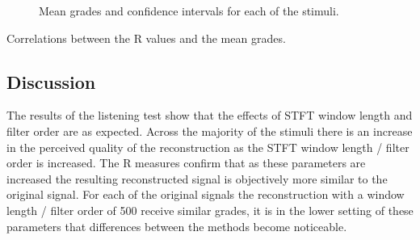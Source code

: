 \begin{figure}[h!]
			\quad
			\caption{Mean grades and confidence intervals for each of the stimuli.}
			\label{fig:SMCResults}
		\end{figure}

		\begin{table}[h!]
			\centering
			
			\caption{Correlations between the R values and the mean grades.}
			\label{tab:SMCCorrelations}
		\end{table}

	\subsection{Discussion}
	\label{sec:PerceptualExperiments-Reconstruction-Discussion}
		The results of the listening test show that the effects of STFT window length and filter order are as
		expected. Across the majority of the stimuli there is an increase in the perceived quality of the
		reconstruction as the STFT window length / filter order is increased. The R measures confirm
		that as these parameters are increased the resulting reconstructed signal is objectively more similar to
		the original signal. For each of the original signals the reconstruction with a window length / filter
		order of 500 receive similar grades, it is in the lower setting of these parameters that differences
		between the methods become noticeable.

